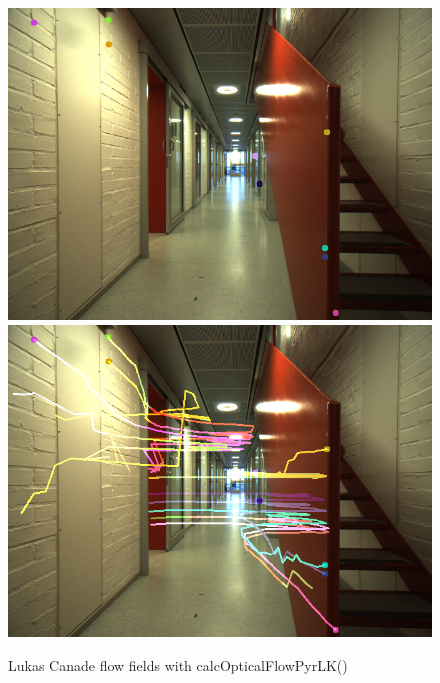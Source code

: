 \documentclass{article}
\begin{document}
\begin{figure}
\center
            \includegraphics[width=1\textwidth]{lkflow}
            \includegraphics[width=1\textwidth]{lkflowmod}
\caption{Lukas Canade flow fields with calcOpticalFlowPyrLK()}
\end{figure}       
\end{document}
